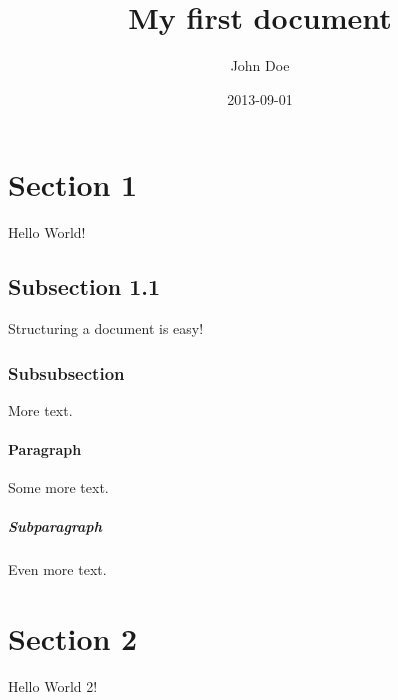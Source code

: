 \documentclass{article}
\title{My first document}
\date{2013-09-01}
\author{John Doe}
\begin{document}
    \maketitle
    \newpage


    \section{Section 1}
    Hello World!

    \subsection{Subsection 1.1}
    Structuring a document is easy!

    \subsubsection{Subsubsection}
    More text.

    \paragraph{Paragraph}
    Some more text.

    \subparagraph{Subparagraph}
    Even more text.

    \section{Section 2}
    Hello World 2!
\end{document}
